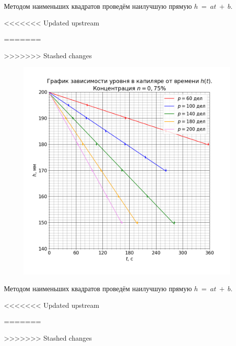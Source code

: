 Методом наименьших квадратов проведём наилучшую прямую $h~=~at~+~b$.

<<<<<<< Updated upstream

=======

>>>>>>> Stashed changes

\begin{figure}[H]
	\centering
	\includegraphics[width=1 \textwidth]{../plots/graph_h_t_2.png}
\end{figure}

Методом наименьших квадратов проведём наилучшую прямую $h~=~at~+~b$.

<<<<<<< Updated upstream

=======

>>>>>>> Stashed changes

